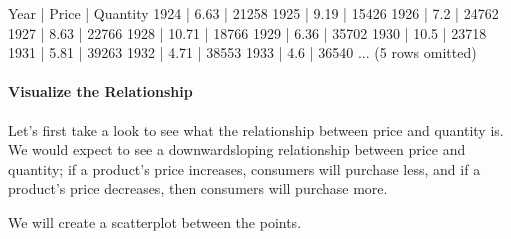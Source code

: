 \documentclass[letterpaper,10pt,english]{jupyterBook}
\begin{document}
\begin{sphinxVerbatim}[commandchars=\\\{\}]
    
\end{sphinxVerbatim}

\begin{sphinxVerbatim}[commandchars=\\\{\}]
Year | Price | Quantity
1924 | 6.63  | 21258
1925 | 9.19  | 15426
1926 | 7.2   | 24762
1927 | 8.63  | 22766
1928 | 10.71 | 18766
1929 | 6.36  | 35702
1930 | 10.5  | 23718
1931 | 5.81  | 39263
1932 | 4.71  | 38553
1933 | 4.6   | 36540
... (5 rows omitted)
\end{sphinxVerbatim}


\paragraph{Visualize the  Relationship}
\label{\detokenize{content/02-supply/03-market-equilibria:visualize-the-relationship}}
\sphinxAtStartPar
Let’s first take a look to see what the relationship between price and quantity is. We would expect to see a downward\sphinxhyphen{}sloping relationship between price and quantity; if a product’s price increases, consumers will purchase less, and if a product’s price decreases, then consumers will purchase more.

\sphinxAtStartPar
We will create a scatterplot between the points.

\begin{sphinxVerbatim}[commandchars=\\\{\}]
   
   
\end{sphinxVerbatim}
\end{document}
